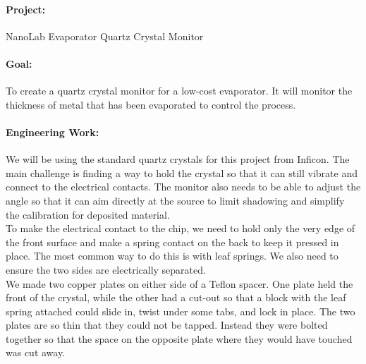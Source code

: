 \documentclass[12pt]{report}
\begin{document}
\paragraph{Project:} NanoLab Evaporator Quartz Crystal Monitor
\paragraph{Goal:} To create a quartz crystal monitor for a low-cost evaporator. It will monitor the thickness of metal that has been evaporated to control the process. 

\paragraph{Engineering Work:}
We will be using the standard quartz crystals for this project from Inficon. The main challenge is finding a way to hold the crystal so that it can still vibrate and connect to the electrical contacts. The monitor also needs to be able to adjust the angle so that it can aim directly at the source to limit shadowing and simplify the calibration for deposited material. \\
To make the electrical contact to the chip, we need to hold only the very edge of the front surface and make a spring contact on the back to keep it pressed in place. The most common way to do this is with leaf springs. We also need to ensure the two sides are electrically separated. \\
We made two copper plates on either side of a Teflon spacer. One plate held the front of the crystal, while the other had a cut-out so that a block with the leaf spring attached could slide in, twist under some tabs, and lock in place. The two plates are so thin that they could not be tapped. Instead they were bolted together so that the space on the opposite plate where they would have touched was cut away. 
\end{document}
